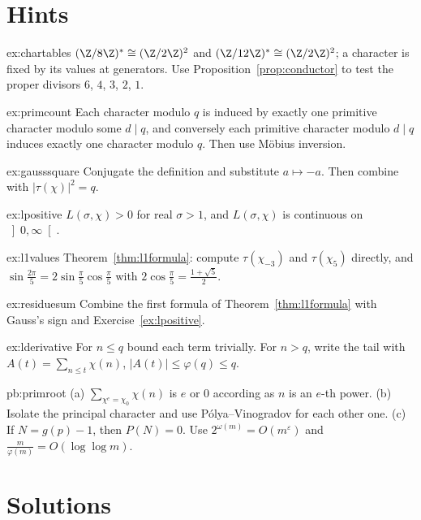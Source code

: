 \section{Hints}

\begin{hint}{ex:chartables}
$(\Z/8\Z)^*\cong(\Z/2\Z)^2$ and $(\Z/12\Z)^*\cong(\Z/2\Z)^2$; a character is fixed by its values at generators. Use Proposition~\ref{prop:conductor} to test
the proper divisors $6$, $4$, $3$, $2$, $1$.
\end{hint}
\begin{hint}{ex:primcount}
Each character modulo $q$ is induced by exactly one primitive character modulo some $d\mid q$, and conversely each primitive character
modulo $d\mid q$ induces exactly one character modulo $q$. Then use Möbius inversion.
\end{hint}
\begin{hint}{ex:gausssquare}
Conjugate the definition and substitute $a\mapsto-a$. Then combine with $|\tau(\chi)|^2=q$.
\end{hint}
\begin{hint}{ex:lpositive}
$L(\sigma,\chi)>0$ for real $\sigma>1$, and $L(\sigma,\chi)$ is continuous on $\left]0,\infty\right[$.
\end{hint}
\begin{hint}{ex:l1values}
Theorem~\ref{thm:l1formula}: compute $\tau(\chi_{-3})$ and $\tau(\chi_5)$ directly, and $\sin\frac{2\pi}5=2\sin\frac\pi5\cos\frac\pi5$ with $2\cos\frac\pi5=\frac{1+\sqrt5}2$.
\end{hint}
\begin{hint}{ex:residuesum}
Combine the first formula of Theorem~\ref{thm:l1formula} with Gauss's sign and Exercise~\ref{ex:lpositive}.
\end{hint}
\begin{hint}{ex:lderivative}
For $n\le q$ bound each term trivially. For $n>q$, write the tail with $A(t)=\sum_{n\le t}\chi(n)$, $|A(t)|\le\varphi(q)\le q$.
\end{hint}

\begin{hint}{pb:primroot}
(a) $\sum_{\chi^e=\chi_0}\chi(n)$ is $e$ or $0$ according as $n$ is an $e$-th power. (b) Isolate the principal character and use Pólya--Vinogradov for each other one.
(c) If $N=g(p)-1$, then $P(N)=0$. Use $2^{\omega(m)}=O(m^\varepsilon)$ and $\frac m{\varphi(m)}=O(\log\log m)$.
\end{hint}

\section{Solutions}

